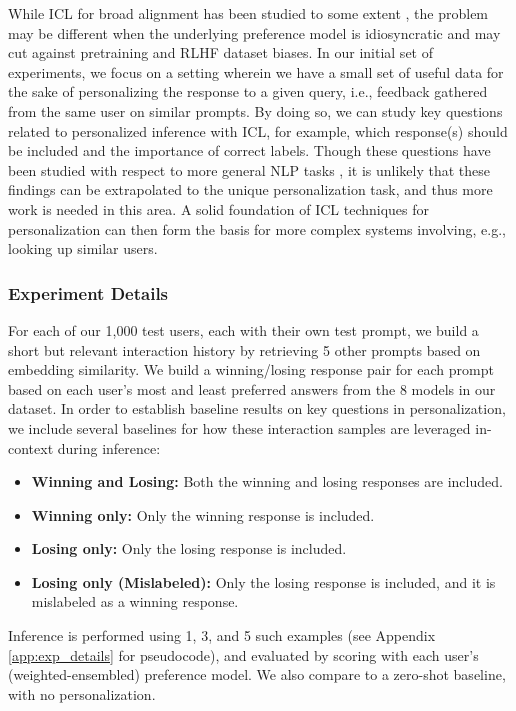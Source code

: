While ICL for broad alignment has been studied to some extent \citep{lin2023unlockingspellbasellms}, the problem may be different when the underlying preference model is idiosyncratic and may cut against pretraining and RLHF dataset biases.
In our initial set of experiments, we focus on a setting wherein we have a small set of useful data for the sake of personalizing the response to a given query, i.e., feedback gathered from the same user on similar prompts.  
By doing so, we can study key questions related to personalized inference with ICL, for example, which response(s) should be included and the importance of correct labels.  
Though these questions have been studied with respect to more general NLP tasks \citep{min2022rethinkingroledemonstrationsmakes, yoo2022groundtruthlabelsmatterdeeper, pan2023incontextlearninglearnsincontext}, it is unlikely that these findings can be extrapolated to the unique personalization task, and thus more work is needed in this area.
A solid foundation of ICL techniques for personalization can then form the basis for more complex systems involving, e.g., looking up similar users.


\subsubsection{Experiment Details}

For each of our 1,000 test users, each with their own test prompt, we build a short but relevant interaction history by retrieving 5 other prompts based on embedding similarity. We build a winning/losing response pair for each prompt based on each user's most and least preferred answers from the 8 models in our dataset.  In order to establish baseline results on key questions in personalization, we include several baselines for how these interaction samples are leveraged in-context during inference: 
\begin{itemize}
    \item \textbf{Winning and Losing:} Both the winning and losing responses are included.
    \item \textbf{Winning only:} Only the winning response is included.
    \item \textbf{Losing only:} Only the losing response is included.
    \item \textbf{Losing only (Mislabeled):} Only the losing response is included, and it is mislabeled as a winning response.
\end{itemize}
Inference is performed using 1, 3, and 5 such examples (see Appendix \ref{app:exp_details} for pseudocode), and evaluated by scoring with each user's (weighted-ensembled) preference model.  We also compare to a zero-shot baseline, with no personalization.

